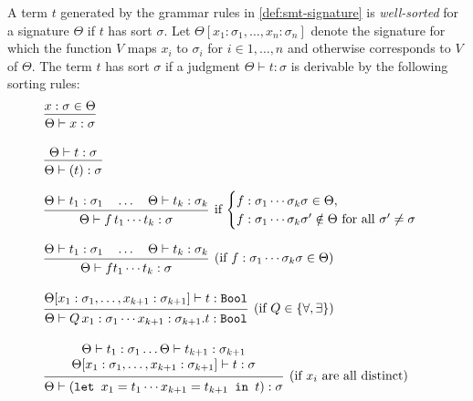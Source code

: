 \begin{definition}
A term $t$ generated by the grammar rules in \cref{def:smt-signature} is \emph{well-sorted} for a signature $\Theta$ if $t$ has sort $\sigma$.  
Let $\Theta[x_1 : \sigma_1, \dots, x_n : \sigma_n]$ denote the signature for which the function $V$ maps $x_i$ to $\sigma_i$ for $i \in 1,\dots,n$ and otherwise corresponds to $V$ of $\Theta$.  
The term $t$ has sort $\sigma$ if a judgment $\Theta \vdash t : \sigma$ is derivable by the following sorting rules:
\[
\begin{array}{l}
\begin{prooftree}
\hypo{x : \sigma \in \Theta}
\infer1{\Theta \vdash x : \sigma}
\end{prooftree}
\\[2em]
\begin{prooftree}
\hypo{\Theta \vdash t : \sigma}
\infer1{\Theta \vdash (t) : \sigma}
\end{prooftree}
\\[2em]
\begin{prooftree}
\hypo{\Theta \vdash t_1 : \sigma_1 \quad \dots \quad \Theta \vdash t_k : \sigma_k}
\infer1[if $\begin{cases} f : \sigma_1 \cdots \sigma_k \sigma \in \Theta, \\ f : \sigma_1 \cdots \sigma_k \sigma' \notin \Theta \text{ for all } \sigma' \neq \sigma \end{cases}$]{\Theta \vdash f\, t_1 \cdots t_k : \sigma}
\end{prooftree}
\\[2em]
\begin{prooftree}
\hypo{\Theta \vdash t_1 : \sigma_1 \quad \dots \quad \Theta \vdash t_k : \sigma_k}
\infer1[(if $f : \sigma_1 \cdots \sigma_k \sigma \in \Theta$)]{\Theta \vdash f t_1 \cdots t_k : \sigma}
\end{prooftree}
\\[2em]
\begin{prooftree}
\hypo{\Theta[x_1 : \sigma_1, \dots, x_{k+1} : \sigma_{k+1}] \vdash t : \kw{Bool}}
\infer1[(if $Q \in \{\forall, \exists\}$)]{\Theta \vdash Q\, x_1 : \sigma_1 \cdots x_{k+1} : \sigma_{k+1} . t : \kw{Bool}}
\end{prooftree}
\\[2em]
\begin{prooftree}
\hypo{
  \begin{matrix}
    \Theta \vdash t_1 : \sigma_1 \dots  \Theta \vdash t_{k+1} : \sigma_{k+1}  \\
    \Theta[x_1 : \sigma_1, \dots, x_{k+1} : \sigma_{k+1}] \vdash t : \sigma
  \end{matrix}
}
\infer1[(if $x_i$ are all distinct)]{\Theta \vdash (\kw{let } x_1 = t_1 \cdots x_{k+1} = t_{k+1} \kw{ in } t) : \sigma}
\end{prooftree}
\end{array}
\]
\end{definition}



